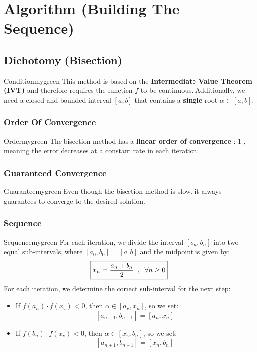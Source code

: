 \newpage
\null

\section{Algorithm (Building The Sequence)}
\subsection{Dichotomy (Bisection)}
\begin{prettyBox}{Condition}{mygreen}
This method is based on the \textbf{Intermediate Value Theorem (IVT)} and therefore requires the function \( f \) to be continuous.  
Additionally, we need a closed and bounded interval \([a, b]\) that contains a \textbf{single} root \( \alpha \in [a, b] \).
\end{prettyBox}

\vspace{0.25cm}

\subsubsection{Order Of Convergence}
\begin{prettyBox}{Order}{mygreen}
The bisection method has a \textbf{linear order of convergence} : 1 , meaning the error decreases at a constant rate in each iteration.  
\end{prettyBox}

\vspace{0.25cm}
\subsubsection{Guaranteed Convergence}
\begin{prettyBox}{Guarantee}{mygreen}
Even though the bisection method is slow, it always guarantees to converge to the desired solution.
\end{prettyBox}

\vspace{0.25cm}
\subsubsection{Sequence}
\begin{prettyBox}{Sequence}{mygreen}
For each iteration, we divide the interval \([a_n,b_n]\) into two equal sub-intervals,
where \([a_0,b_0] = [a,b]\) and the midpoint is given by:
\[
    \boxed{x_n = \frac{a_n + b_n}{2} \hspace{0.2cm}, \hspace{0.2cm} \forall n \geq 0}
\]
For each iteration, we determine the correct sub-interval for the next step:
\begin{itemize}
    \item If \( f(a_n) \cdot f(x_n) < 0 \), then \( \alpha \in [a_n, x_n] \), so we set:
    \[
    [a_{n+1}, b_{n+1}] = [a_n, x_n]
    \]
    \item If \( f(b_n) \cdot f(x_n) < 0 \), then \( \alpha \in [x_n, b_n] \), so we set:
    \[
    [a_{n+1}, b_{n+1}] = [x_n, b_n]
    \]
\end{itemize}
\end{prettyBox}

